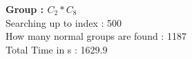 \textbf{Group : $C_2*C_8$}\\
Searching up to index : 500\\
How many normal groups are found : 1187\\
Total Time in s : 1629.9\\

